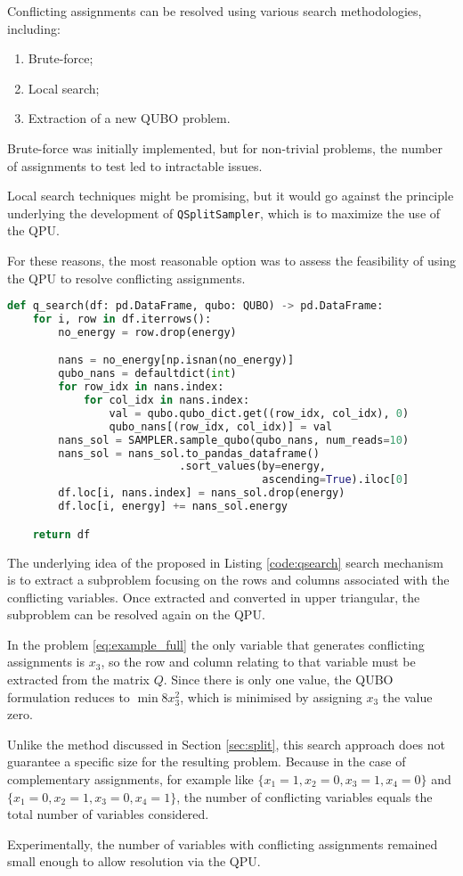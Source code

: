 Conflicting assignments can be resolved using various search methodologies, including: 
\begin{enumerate} 
	\item Brute-force; 
	\item Local search; 
	\item Extraction of a new QUBO problem. 
\end{enumerate}

Brute-force was initially implemented, but for non-trivial problems, the number of assignments to test led to intractable issues.

Local search techniques might be promising, but it would go against the principle underlying the development of \texttt{QSplitSampler}, which is to maximize the use of the QPU.

For these reasons, the most reasonable option was to assess the feasibility of using the QPU to resolve conflicting assignments.

\begin{lstlisting}[language=Python, caption=QUBO extractor function, label=code:qsearch]
def q_search(df: pd.DataFrame, qubo: QUBO) -> pd.DataFrame:
    for i, row in df.iterrows():
        no_energy = row.drop(energy)

        nans = no_energy[np.isnan(no_energy)]
        qubo_nans = defaultdict(int)
        for row_idx in nans.index:
            for col_idx in nans.index:
                val = qubo.qubo_dict.get((row_idx, col_idx), 0)
                qubo_nans[(row_idx, col_idx)] = val
        nans_sol = SAMPLER.sample_qubo(qubo_nans, num_reads=10)
        nans_sol = nans_sol.to_pandas_dataframe()
                           .sort_values(by=energy, 
                                        ascending=True).iloc[0]
        df.loc[i, nans.index] = nans_sol.drop(energy)
        df.loc[i, energy] += nans_sol.energy

    return df
\end{lstlisting}

The underlying idea of the proposed in Listing \ref{code:qsearch} search mechanism is to extract a subproblem focusing on the rows and columns associated with the conflicting variables. 
Once extracted and converted in upper triangular, the subproblem can be resolved again on the QPU.

In the problem \eqref{eq:example_full} the only variable that generates conflicting assignments is $x_3$, so the row and column relating to that variable must be extracted from the matrix $Q$.
Since there is only one value, the QUBO formulation reduces to $\min 8x_3^2$, which is minimised by assigning $x_3$ the value zero.

Unlike the method discussed in Section \ref{sec:split}, this search approach does not guarantee a specific size for the resulting problem.
Because in the case of complementary assignments, for example like $\{x_1=1,x_2=0,x_3=1,x_4=0\}$ and $\{x_1=0,x_2=1,x_3=0,x_4=1\}$, the number of conflicting variables equals the total number of variables considered. 

Experimentally, the number of variables with conflicting assignments remained small enough to allow resolution via the QPU.